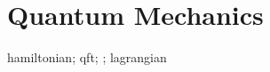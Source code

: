 \chapter{Quantum Mechanics}\label{chp:quantum_mechanics}

\gls{hamiltonian};
\gls{qft};
;
\gls{lagrangian}
